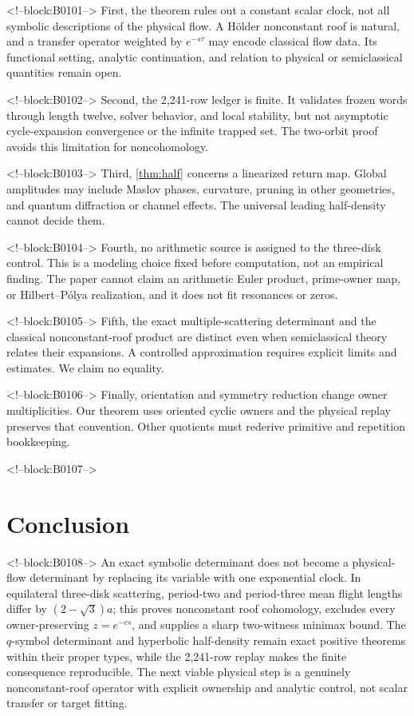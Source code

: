 \documentclass[11pt,a4paper]{article}
\theoremstyle{definition}
\theoremstyle{remark}
\begin{document}
<!--block:B0101-->
First, the theorem rules out a constant scalar clock, not all symbolic descriptions of the physical flow. A Hölder nonconstant roof is natural, and a transfer operator weighted by \(e^{-s\tau}\) may encode classical flow data. Its functional setting, analytic continuation, and relation to physical or semiclassical quantities remain open.

<!--block:B0102-->
Second, the 2,241-row ledger is finite. It validates frozen words through length twelve, solver behavior, and local stability, but not asymptotic cycle-expansion convergence or the infinite trapped set. The two-orbit proof avoids this limitation for noncohomology.

<!--block:B0103-->
Third, \cref{thm:half} concerns a linearized return map. Global amplitudes may include Maslov phases, curvature, pruning in other geometries, and quantum diffraction or channel effects. The universal leading half-density cannot decide them.

<!--block:B0104-->
Fourth, no arithmetic source is assigned to the three-disk control. This is a modeling choice fixed before computation, not an empirical finding. The paper cannot claim an arithmetic Euler product, prime-owner map, or Hilbert--Pólya realization, and it does not fit resonances or zeros.

<!--block:B0105-->
Fifth, the exact multiple-scattering determinant and the classical nonconstant-roof product are distinct even when semiclassical theory relates their expansions. A controlled approximation requires explicit limits and estimates. We claim no equality.

<!--block:B0106-->
Finally, orientation and symmetry reduction change owner multiplicities. Our theorem uses oriented cyclic owners and the physical replay preserves that convention. Other quotients must rederive primitive and repetition bookkeeping.

<!--block:B0107-->
\section{Conclusion}

<!--block:B0108-->
An exact symbolic determinant does not become a physical-flow determinant by replacing its variable with one exponential clock. In equilateral three-disk scattering, period-two and period-three mean flight lengths differ by \((2-\sqrt3)a\); this proves nonconstant roof cohomology, excludes every owner-preserving \(z=e^{-cs}\), and supplies a sharp two-witness minimax bound. The \(q\)-symbol determinant and hyperbolic half-density remain exact positive theorems within their proper types, while the 2,241-row replay makes the finite consequence reproducible. The next viable physical step is a genuinely nonconstant-roof operator with explicit ownership and analytic control, not scalar transfer or target fitting.
\end{document}
